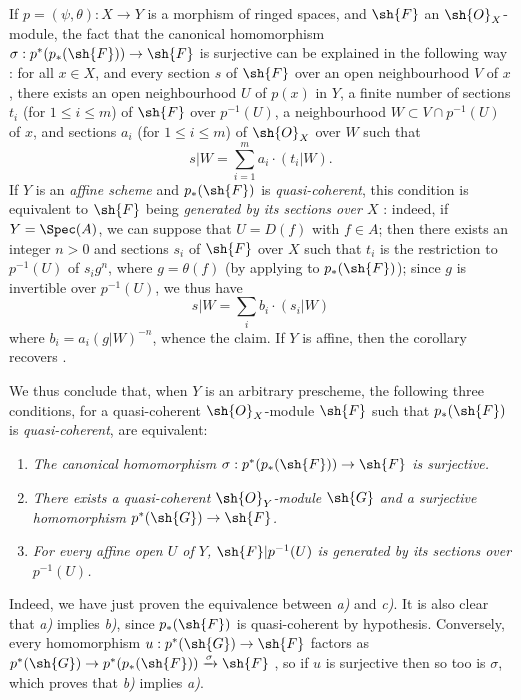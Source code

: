 \begin{remarks}[3.4.7]
\label{II.3.4.7}
If $p=(\psi,\theta):X\to Y$ is a morphism of ringed spaces, and $\sh{F}$ an $\sh{O}_X$-module, the fact that the canonical homomorphism $\sigma:p^*(p_*(\sh{F}))\to\sh{F}$ is surjective can be explained in the following way : for all $x\in X$, and every section $s$ of $\sh{F}$ over an open neighbourhood $V$ of $x$, there exists an open neighbourhood $U$ of $p(x)$ in $Y$, a finite number of sections $t_i$ (for $1\leq i\leq m$) of $\sh{F}$ over $p^{-1}(U)$, a neighbourhood $W\subset V\cap p^{-1}(U)$ of $x$, and sections $a_i$ (for $1\leq i\leq m$) of $\sh{O}_X$ over $W$ such that
\[
  s|W = \sum_{i=1}^m a_i\cdot(t_i|W).
\]
If $Y$ is an \emph{affine scheme} and $p_*(\sh{F})$ is \emph{quasi-coherent}, this condition is equivalent to $\sh{F}$ being \emph{generated by its sections over $X$} : indeed, if $Y=\Spec(A)$, we can suppose that $U=D(f)$ with $f\in A$;
then there exists an integer $n>0$ and sections $s_i$ of $\sh{F}$ over $X$ such that $t_i$ is the restriction to $p^{-1}(U)$ of $s_ig^n$, where $g=\theta(f)$ (by applying  to $p_*(\sh{F})$);
since $g$ is invertible over $p^{-1}(U)$, we thus have
\[
  s|W = \sum_i b_i\cdot(s_i|W)
\]
where $b_i=a_i(g|W)^{-n}$, whence the claim.
If $Y$ is affine, then the corollary  recovers .

We thus conclude that, when $Y$ is an arbitrary prescheme, the following three conditions, for a quasi-coherent $\sh{O}_X$-module $\sh{F}$ such that $p_*(\sh{F})$ is \emph{quasi-coherent}, are equivalent:
\begin{enumerate}
  \item[a)] \emph{The canonical homomorphism $\sigma:p^*(p_*(\sh{F}))\to\sh{F}$ is surjective.}
  \item[b)] \emph{There exists a quasi-coherent $\sh{O}_Y$-module $\sh{G}$ and a surjective homomorphism $p^*(\sh{G})\to\sh{F}$.}
  \item[c)] \emph{For every affine open $U$ of $Y$, $\sh{F}|p^{-1}(U)$ is generated by its sections over $p^{-1}(U)$.}
\end{enumerate}

Indeed, we have just proven the equivalence between \emph{a)} and \emph{c)}.
It is also clear that \emph{a)} implies \emph{b)}, since $p_*(\sh{F})$ is quasi-coherent by hypothesis.
Conversely, every homomorphism $u:p^*(\sh{G})\to\sh{F}$ factors as $p^*(\sh{G})\to p^*(p_*(\sh{F}))\xrightarrow{\sigma}\sh{F}$ , so if $u$ is surjective then so too is $\sigma$, which proves that \emph{b)} implies \emph{a)}.
\end{remarks}

